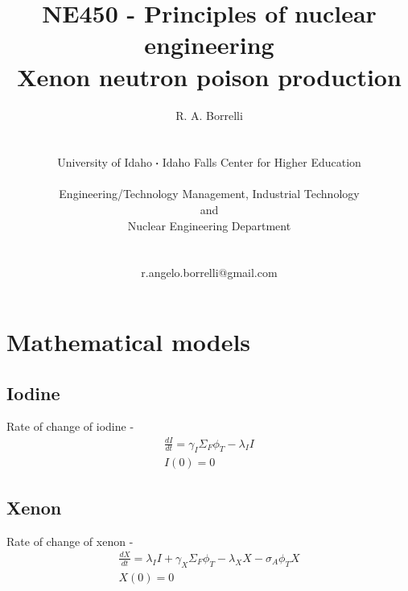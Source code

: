 \documentclass[11pt,a4paper]{article}
\newcommand*\sq{\mathbin{\vcenter{\hbox{\rule{.3ex}{.3ex}}}}} %
\begin{document}
\begin{titlepage}
    \title{
        NE450 - Principles of nuclear engineering\\
        Xenon neutron poison production\\
    }
    \author{
        R. A. Borrelli
        \\ \\ \\
        University of Idaho $\sq$ Idaho Falls Center for Higher Education
        \\ \\
        Engineering/Technology Management, Industrial Technology\\and\\Nuclear Engineering Department
        \\ \\ \\
        r.angelo.borrelli@gmail.com
    }
\clearpage %
\maketitle
\thispagestyle{empty} %
\end{titlepage}

\section{Mathematical models}
\subsection{Iodine}
\noindent Rate of change of iodine - 
\begin{equation} \label{eq-i-dq}
\begin{gathered}
\frac{dI}{dt}=\gamma_I \Sigma_F \phi_T-\lambda_I I \\
I(0)=0
\end{gathered}
\end{equation}

\subsection{Xenon}
\noindent Rate of change of xenon - 
\begin{equation} \label{eq-xe-dq}
\begin{gathered}
\frac{dX}{dt}=\lambda_I I + \gamma_X \Sigma_F \phi_T - \lambda_X X - \sigma_A \phi_T X \\
X(0)=0
\end{gathered}
\end{equation}
\end{document}
